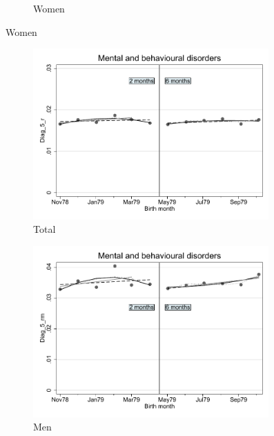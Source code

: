 \documentclass[a4paper ]{article}
\begin{document}
\begin{figure}[h!]
\begin{subfigure}[t]{0.31\textwidth}
		\caption{Women}
	\end{subfigure}
\end{figure}
\newpage
\begin{figure}[h]
	\centering
	\begin{subfigure}[t]{0.31\textwidth}
		\centering
		\includegraphics[width=0.99\textwidth]{R1_RD_Diag_5_r_fits}
		\caption{Total}		
	\end{subfigure}
	\begin{subfigure}[t]{0.31\textwidth}
		\centering
		\includegraphics[width=0.99\textwidth]{R1_RD_Diag_5_rm_fits}
		\caption{Men}		
	\end{subfigure}
	\quad
	\begin{subfigure}[t]{0.31\textwidth}

\end{subfigure}
\end{figure}
\end{document}
